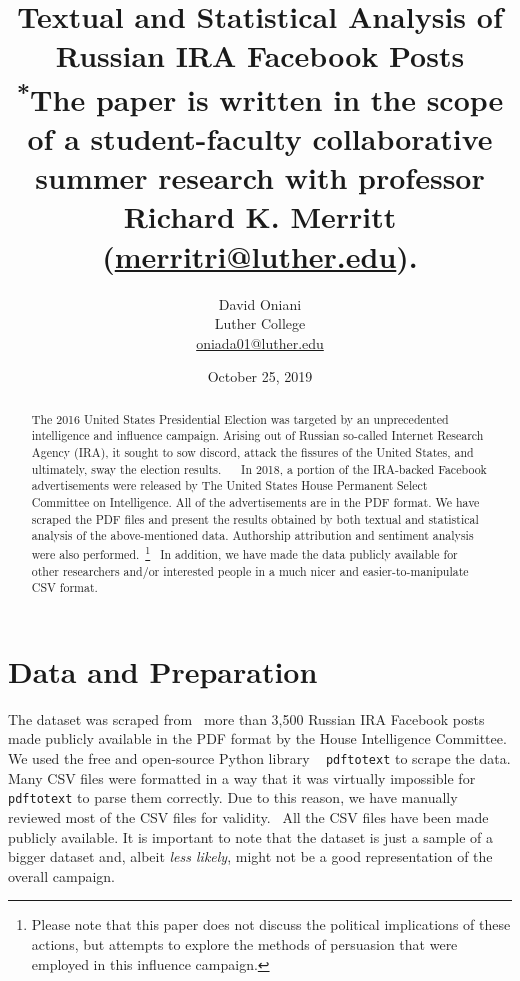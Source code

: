 \documentclass[12pt]{article}
\author{David Oniani\\
        Luther College\\
        \href{mailto:oniada01@luther.edu}{oniada01@luther.edu}}
\title{\textbf{Textual and Statistical Analysis of Russian IRA Facebook Posts}\\
      \small \textsuperscript{*}The paper is written in the scope of a student-faculty collaborative\\
                                summer research with professor Richard K. Merritt (\href{mailto:merritri@luther.edu}{merritri@luther.edu}).}
\date{October 25, 2019}
\theoremstyle{definition}
\begin{document}
\maketitle


\begin{abstract}

\noindent The 2016 United States Presidential Election was targeted by an
unprecedented intelligence and influence campaign. Arising out of Russian
so-called Internet Research Agency (IRA), it sought to sow discord, attack
the fissures of the United States, and ultimately, sway the election results.
~\cite{ira2016}~\cite{ira2016data} In 2018, a portion of the IRA-backed
Facebook advertisements were released by The United States House Permanent
Select Committee on Intelligence. All of the advertisements are in the PDF
format. We have scraped the PDF files and present the results obtained by both
textual and statistical analysis of the above-mentioned data. Authorship
attribution and sentiment analysis were also performed.~\footnote{Please note
that this paper does not discuss the political implications of these actions,
but attempts to explore the methods of persuasion that were employed in this
influence campaign.}~\cite{ira2016csvdata} In addition, we have made the data
publicly available for other researchers and/or interested people in a much
nicer and easier-to-manipulate CSV format.
\end{abstract}


\newpage
\tableofcontents
\newpage


\section*{\centering Data and Preparation}

The dataset was scraped from~\cite{ira2016data} more than 3,500 Russian IRA
Facebook posts made publicly available in the PDF format by the House
Intelligence Committee. We used the free and open-source Python library
~\cite{pdftotext} \texttt{pdftotext} to scrape the data. Many CSV files were
formatted in a way that it was virtually impossible for \texttt{pdftotext} to
parse them correctly. Due to this reason, we have manually reviewed most of the
CSV files for validity.~\cite{ira2016csvdata} All the CSV files have been made
publicly available. It is important to note that the dataset is just a sample
of a bigger dataset and, albeit \textit{less likely}, might not be a good
representation of the overall campaign.
\end{document}
